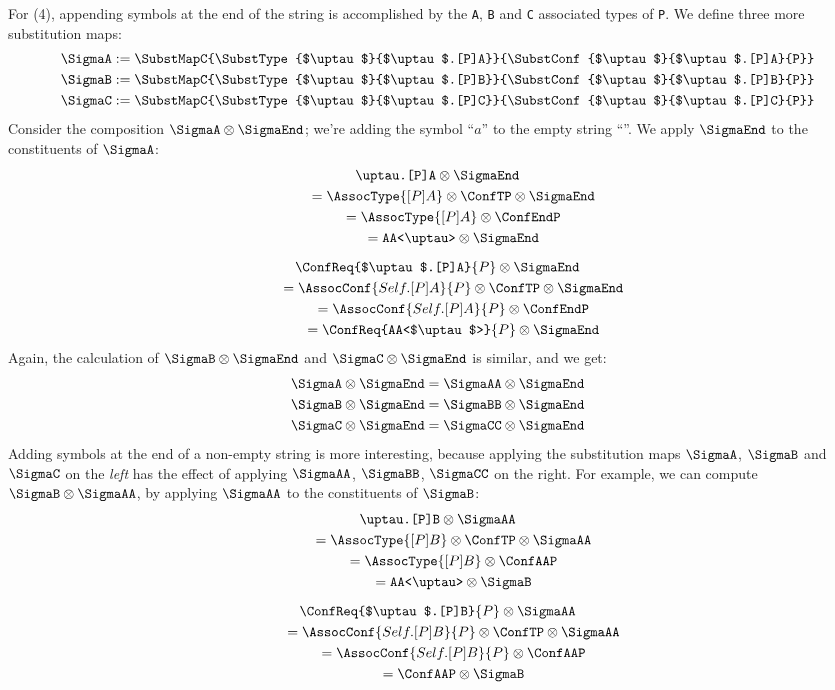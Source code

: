 \documentclass[../generics]{subfiles}
\begin{document}
For (4), appending symbols at the end of the string is accomplished by the \texttt{A}, \texttt{B} and \texttt{C} associated types of \texttt{P}. We define three more substitution maps:
\begin{gather*}
\SigmaA := \SubstMapC{\SubstType{$\uptau$}{$\uptau$.[P]A}}{\SubstConf{$\uptau$}{$\uptau$.[P]A}{P}}\\
\SigmaB := \SubstMapC{\SubstType{$\uptau$}{$\uptau$.[P]B}}{\SubstConf{$\uptau$}{$\uptau$.[P]B}{P}}\\
\SigmaC := \SubstMapC{\SubstType{$\uptau$}{$\uptau$.[P]C}}{\SubstConf{$\uptau$}{$\uptau$.[P]C}{P}}
\end{gather*}
Consider the composition $\SigmaA\otimes\SigmaEnd$; we're adding the symbol ``$a$'' to the empty string ``''. We apply $\SigmaEnd$ to the constituents of $\SigmaA$:
\begin{gather*}
\texttt{$\uptau$.[P]A} \otimes \SigmaEnd\\
\qquad {} = \AssocType{[P]A} \otimes \ConfTP \otimes \SigmaEnd\\
\qquad {} = \AssocType{[P]A} \otimes \ConfEndP\\
\qquad {} = \texttt{AA<$\uptau$>} \otimes \SigmaEnd\\[\medskipamount]
\ConfReq{$\uptau$.[P]A}{P} \otimes \SigmaEnd\\
\qquad {} = \AssocConf{Self.[P]A}{P} \otimes \ConfTP \otimes \SigmaEnd\\
\qquad {} = \AssocConf{Self.[P]A}{P} \otimes \ConfEndP\\
\qquad {} = \ConfReq{AA<$\uptau$>}{P} \otimes \SigmaEnd
\end{gather*}
Again, the calculation of $\SigmaB\otimes\SigmaEnd$ and $\SigmaC\otimes\SigmaEnd$ is similar, and we get:
\begin{gather*}
\SigmaA\otimes\SigmaEnd=\SigmaAA\otimes\SigmaEnd\\
\SigmaB\otimes\SigmaEnd=\SigmaBB\otimes\SigmaEnd\\
\SigmaC\otimes\SigmaEnd=\SigmaCC\otimes\SigmaEnd
\end{gather*}
Adding symbols at the end of a non-empty string is more interesting, because applying the substitution maps $\SigmaA$, $\SigmaB$ and $\SigmaC$ on the \emph{left} has the effect of applying $\SigmaAA$, $\SigmaBB$, $\SigmaCC$ on the right. For example, we can compute $\SigmaB\otimes\SigmaAA$, by applying $\SigmaAA$ to the constituents of $\SigmaB$:
\begin{gather*}
\texttt{$\uptau$.[P]B} \otimes \SigmaAA\\
\qquad {} = \AssocType{[P]B} \otimes \ConfTP \otimes \SigmaAA\\
\qquad {} = \AssocType{[P]B} \otimes \ConfAAP\\
\qquad {} = \texttt{AA<$\uptau$>} \otimes \SigmaB\\[\medskipamount]
\ConfReq{$\uptau$.[P]B}{P} \otimes \SigmaAA\\
\qquad {} = \AssocConf{Self.[P]B}{P} \otimes \ConfTP \otimes \SigmaAA\\
\qquad {} = \AssocConf{Self.[P]B}{P} \otimes \ConfAAP\\
\qquad {} = \ConfAAP \otimes \SigmaB
\end{gather*}
\end{document}
